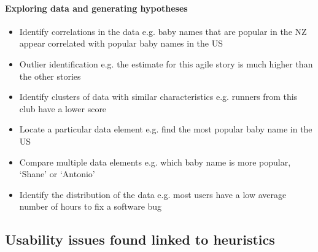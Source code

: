 \paragraph{Exploring data and generating hypotheses}

\begin{itemize}
\item Identify correlations in the data e.g. baby names that are popular in the NZ appear correlated with popular baby names in the US
\item Outlier identification e.g. the estimate for this agile story is much higher than the other stories
\item Identify clusters of data with similar characteristics e.g. runners from this club have a lower score
\item Locate a particular data element e.g. find the most popular baby name in the US
\item Compare multiple data elements e.g. which baby name is more popular, `Shane' or `Antonio'
\item Identify the distribution of the data e.g. most users have a low average number of hours to fix a software bug
\end{itemize}

\newpage
\subsection{Usability issues found linked to heuristics}\label{sect:heuristicresults}

